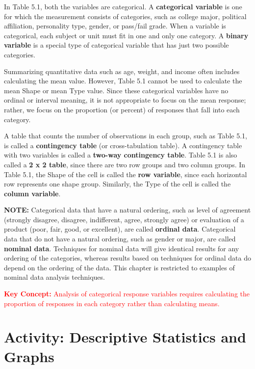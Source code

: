 \documentclass[
]{report}
\begin{document}
In Table 5.1, both the variables are categorical. A \textbf{categorical variable} is one for which the measurement
consists of categories, such as college major, political affiliation, personality type, gender, or pass/fail grade.
When a variable is categorical, each subject or unit must fit in one and only one category. A \textbf{binary variable}
is a special type of categorical variable that has just two possible categories.

Summarizing quantitative data such as age, weight, and income often includes calculating the mean value.
However, Table 5.1 cannot be used to calculate the mean Shape or mean Type value. Since these categorical
variables have no ordinal or interval meaning, it is not appropriate to focus on the mean response; rather, we
focus on the proportion (or percent) of responses that fall into each category.

A table that counts the number of observations in each group, such as Table 5.1, is called a \textbf{contingency table} (or cross-tabulation table). A contingency table with two variables is called a \textbf{two-way contingency table}. Table 5.1 is also called a \textbf{2 x 2 table}, since there are two row groups and two column groups. In Table
5.1, the Shape of the cell is called the \textbf{row variable}, since each horizontal row represents one shape group.
Similarly, the Type of the cell is called the \textbf{column variable}.

\large

\textbf{NOTE:}
Categorical data that have a natural ordering, such as level of agreement (strongly disagree, disagree,
indifferent, agree, strongly agree) or evaluation of a product (poor, fair, good, or excellent), are called
\textbf{ordinal data}. Categorical data that do not have a natural ordering, such as gender or major, are called
\textbf{nominal data}. Techniques for nominal data will give identical results for any ordering of the categories,
whereas results based on techniques for ordinal data do depend on the ordering of the data. This chapter
is restricted to examples of nominal data analysis techniques.
\normalsize

\Large

\textbf{\textcolor{red}{Key Concept:}}
\textcolor{red}{Analysis of categorical response variables requires calculating the proportion of responses in each
category rather than calculating means.}
\normalsize

\hypertarget{activity-descriptive-statistics-and-graphs}{%
\section*{Activity: Descriptive Statistics and Graphs}\label{activity-descriptive-statistics-and-graphs}}
\end{document}
